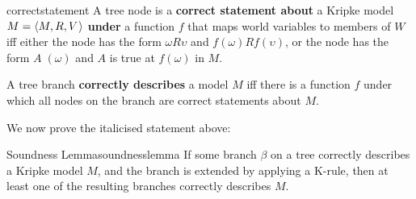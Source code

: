 \begin{definition}{}{correctstatement}
  A tree node is a \textbf{correct statement about} a Kripke model
  $M = \t{M,R,V}$ \textbf{under} a function $f$ that maps world variables to
  members of $W$ iff either the node has the form $\omega R \upsilon$ and
  $f(\omega)Rf(\upsilon)$, or the node has the form $A\; (\omega)$ and $A$ is
  true at $f(\omega)$ in $M$.

  A tree branch \textbf{correctly describes} a model $M$ iff there is a function
  $f$ under which all nodes on the branch are correct statements about $M$.
\end{definition}


We now prove the italicised statement above:

\begin{theorem}{Soundness Lemma}{soundnesslemma}
  If some branch $\beta$ on a tree correctly describes a Kripke model $M$, and
  the branch is extended by applying a K-rule, then at least one of the
  resulting branches correctly describes $M$.
\end{theorem}

